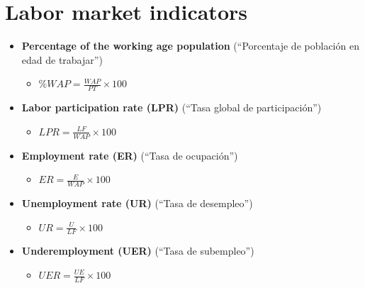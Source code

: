 \documentclass[
  ignorenonframetext,
]{beamer}
\providecommand{\tightlist}{%
  \setlength{\itemsep}{0pt}\setlength{\parskip}{0pt}}\usepackage{longtable,booktabs,array}
\begin{document}
\section{Labor market indicators}\label{labor-market-indicators}

\begin{frame}{}
\label{section-4}
\begin{itemize}
\item
  \textbf{Percentage of the working age population} (``Porcentaje de
  población en edad de trabajar'')

  \begin{itemize}
  \tightlist
  \item
    \(\%WAP = \frac{WAP}{PT} \times 100\)
  \end{itemize}
\item
  \textbf{Labor participation rate (LPR)} (``Tasa global de
  participación'')

  \begin{itemize}
  \tightlist
  \item
    \(LPR = \frac{LF}{WAP} \times 100\)
  \end{itemize}
\end{itemize}
\end{frame}

\begin{frame}{}
\label{section-5}
\begin{itemize}
\item
  \textbf{Employment rate (ER)} (``Tasa de ocupación'')

  \begin{itemize}
  \tightlist
  \item
    \(ER = \frac{E}{WAP} \times 100\)
  \end{itemize}
\item
  \textbf{Unemployment rate (UR)} (``Tasa de desempleo'')

  \begin{itemize}
  \tightlist
  \item
    \(UR = \frac{U}{LF} \times 100\)
  \end{itemize}
\item
  \textbf{Underemployment (UER)} (``Tasa de subempleo'')

  \begin{itemize}
  \tightlist
  \item
    \(UER = \frac{UE}{LF} \times 100\)
  \end{itemize}
\end{itemize}
\end{frame}
\end{document}
